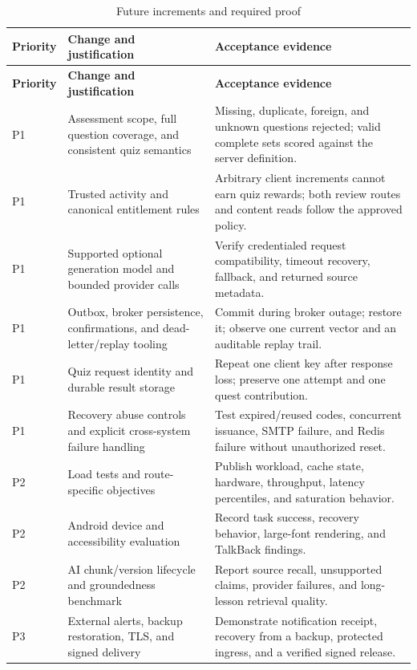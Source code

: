 \documentclass[12pt,a4paper,oneside]{report}
\begin{document}
\begin{longtable}{P{0.13\textwidth}P{0.39\textwidth}P{0.37\textwidth}}
\caption{Future increments and required proof}\\\toprule
\textbf{Priority} & \textbf{Change and justification} & \textbf{Acceptance evidence}\\\midrule\endfirsthead
\toprule\textbf{Priority} & \textbf{Change and justification} & \textbf{Acceptance evidence}\\\midrule\endhead
P1 & Assessment scope, full question coverage, and consistent quiz semantics & Missing, duplicate, foreign, and unknown questions rejected; valid complete sets scored against the server definition.\\
P1 & Trusted activity and canonical entitlement rules & Arbitrary client increments cannot earn quiz rewards; both review routes and content reads follow the approved policy.\\
P1 & Supported optional generation model and bounded provider calls & Verify credentialed request compatibility, timeout recovery, fallback, and returned source metadata.\\
P1 & Outbox, broker persistence, confirmations, and dead-letter/replay tooling & Commit during broker outage; restore it; observe one current vector and an auditable replay trail.\\
P1 & Quiz request identity and durable result storage & Repeat one client key after response loss; preserve one attempt and one quest contribution.\\
P1 & Recovery abuse controls and explicit cross-system failure handling & Test expired/reused codes, concurrent issuance, SMTP failure, and Redis failure without unauthorized reset.\\
P2 & Load tests and route-specific objectives & Publish workload, cache state, hardware, throughput, latency percentiles, and saturation behavior.\\
P2 & Android device and accessibility evaluation & Record task success, recovery behavior, large-font rendering, and TalkBack findings.\\
P2 & AI chunk/version lifecycle and groundedness benchmark & Report source recall, unsupported claims, provider failures, and long-lesson retrieval quality.\\
P3 & External alerts, backup restoration, TLS, and signed delivery & Demonstrate notification receipt, recovery from a backup, protected ingress, and a verified signed release.\\
\bottomrule
\end{longtable}
\end{document}
